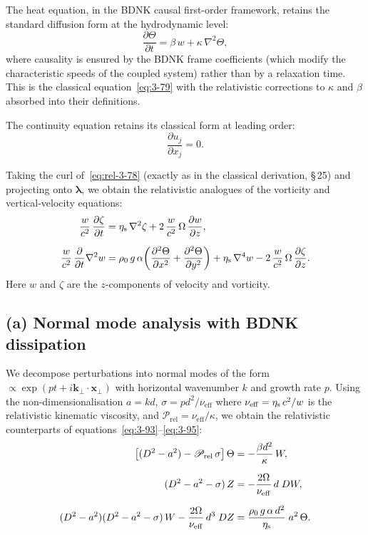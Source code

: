 The heat equation, in the BDNK causal first-order framework, retains
the standard diffusion form at the hydrodynamic level:
\begin{equation}\label{eq:rel-3-79}
  \frac{\partial\Theta}{\partial t}
  = \beta\,w + \kappa\,\nabla^2\Theta,
\end{equation}
where causality is ensured by the BDNK frame coefficients (which
modify the characteristic speeds of the coupled system) rather than by
a relaxation time.  This is the classical equation~\eqref{eq:3-79}
with the relativistic corrections to $\kappa$ and $\beta$ absorbed
into their definitions.

The continuity equation retains its classical form at leading order:
\begin{equation}\label{eq:rel-3-80}
  \frac{\partial u_j}{\partial x_j} = 0.
\end{equation}

Taking the curl of~\eqref{eq:rel-3-78} (exactly as in the classical
derivation, \S\,25) and projecting onto $\boldsymbol{\lambda}$, we obtain
the relativistic analogues of the vorticity and vertical-velocity
equations:
\begin{align}
  \frac{w}{c^2}\,\frac{\partial\zeta}{\partial t}
  &= \eta_{\mathrm{s}}\,\nabla^2\zeta
    + 2\,\frac{w}{c^2}\,\Omega\,\frac{\partial w}{\partial z},
  \label{eq:rel-3-87}\\[6pt]
  \frac{w}{c^2}\,\frac{\partial}{\partial t}\nabla^2 w
  &= \rho_0\,g\,\alpha\!\left(
       \frac{\partial^2\Theta}{\partial x^2}
       + \frac{\partial^2\Theta}{\partial y^2}\right)
    + \eta_{\mathrm{s}}\,\nabla^4 w
    - 2\,\frac{w}{c^2}\,\Omega\,\frac{\partial\zeta}{\partial z}.
  \label{eq:rel-3-88}
\end{align}
Here $w$ and $\zeta$ are the $z$-components of velocity and vorticity.

\subsection*{(a) Normal mode analysis with BDNK dissipation}

We decompose perturbations into normal modes of the form
$\propto \exp(pt + i\mathbf{k}_\perp\cdot\mathbf{x}_\perp)$ with
horizontal wavenumber $k$ and growth rate $p$.  Using
the non-dimensionalisation $a = kd$, $\sigma = pd^2/\nu_{\mathrm{eff}}$
where $\nu_{\mathrm{eff}} = \eta_{\mathrm{s}}\,c^2/w$ is the
relativistic kinematic viscosity, and $\mathscr{P}_{\mathrm{rel}} =
\nu_{\mathrm{eff}}/\kappa$, we obtain the relativistic counterparts of
equations~\eqref{eq:3-93}--\eqref{eq:3-95}:
\begin{align}
  \bigl[(D^2 - a^2)
     - \mathscr{P}_{\mathrm{rel}}\,\sigma\bigr]\,\Theta
  &= -\frac{\beta d^2}{\kappa}\,W,
  \label{eq:rel-3-93}\\[6pt]
  (D^2 - a^2 - \sigma)\,Z
  &= -\frac{2\Omega}{\nu_{\mathrm{eff}}}\,d\;DW,
  \label{eq:rel-3-94}\\[6pt]
  (D^2 - a^2)(D^2 - a^2 - \sigma)\,W
  - \frac{2\Omega}{\nu_{\mathrm{eff}}}\,d^3\;DZ
  &= \frac{\rho_0\,g\,\alpha\,d^2}{\eta_{\mathrm{s}}}\;a^2\,\Theta.
  \label{eq:rel-3-95}
\end{align}

